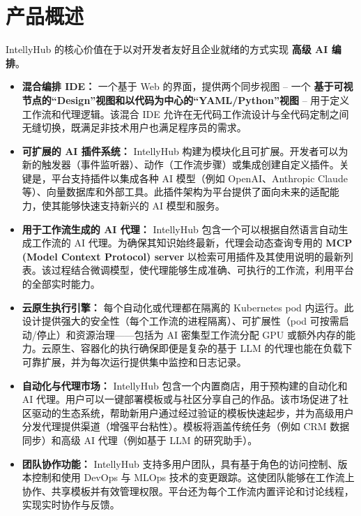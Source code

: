 \documentclass[11pt, a4paper, oneside]{article}
\begin{document}
\section{产品概述}
IntellyHub 的核心价值在于以对开发者友好且企业就绪的方式实现 \textbf{高级 AI 编排}。
\begin{itemize}
    \item \textbf{混合编排 IDE：} 一个基于 Web 的界面，提供两个同步视图 – 一个 \textbf{基于可视节点的“Design”视图和以代码为中心的“YAML/Python”视图} – 用于定义工作流和代理逻辑。该混合 IDE 允许在无代码工作流设计与全代码定制之间无缝切换，既满足非技术用户也满足程序员的需求。
    
    \item \textbf{可扩展的 AI 插件系统：} IntellyHub 构建为模块化且可扩展。开发者可以为新的触发器（事件监听器）、动作（工作流步骤）或集成创建自定义插件。关键是，平台支持插件以集成各种 AI 模型（例如 OpenAI、Anthropic Claude 等）、向量数据库和外部工具。此插件架构为平台提供了面向未来的适配能力，使其能够快速支持新兴的 AI 模型和服务。
    
    \item \textbf{用于工作流生成的 AI 代理：} IntellyHub 包含一个可以根据自然语言自动生成工作流的 AI 代理。为确保其知识始终最新，代理会动态查询专用的 \textbf{MCP (Model Context Protocol) server} 以检索可用插件及其使用说明的最新列表。该过程结合微调模型，使代理能够生成准确、可执行的工作流，利用平台的全部实时能力。
    
    \item \textbf{云原生执行引擎：} 每个自动化或代理都在隔离的 Kubernetes pod 内运行。此设计提供强大的安全性（每个工作流的进程隔离）、可扩展性（pod 可按需启动/停止）和资源治理——包括为 AI 密集型工作流分配 GPU 或额外内存的能力。云原生、容器化的执行确保即便是复杂的基于 LLM 的代理也能在负载下可靠扩展，并为每次运行提供集中监控和日志记录。
    
    \item \textbf{自动化与代理市场：} IntellyHub 包含一个内置商店，用于预构建的自动化和 AI 代理。用户可以一键部署模板或与社区分享自己的作品。该市场促进了社区驱动的生态系统，帮助新用户通过经过验证的模板快速起步，并为高级用户分发代理提供渠道（增强平台粘性）。模板将涵盖传统任务（例如 CRM 数据同步）和高级 AI 代理（例如基于 LLM 的研究助手）。
    
    \item \textbf{团队协作功能：} IntellyHub 支持多用户团队，具有基于角色的访问控制、版本控制和使用 DevOps 与 MLOps 技术的变更跟踪。这使团队能够在工作流上协作、共享模板并有效管理权限。平台还为每个工作流内置评论和讨论线程，实现实时协作与反馈。
\end{itemize}
\end{document}
